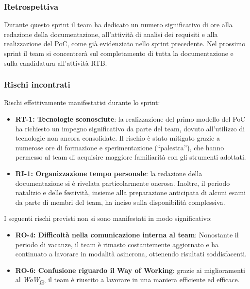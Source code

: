 \documentclass[a4paper,12pt]{article}
\begin{document}
        \subsubsection{Retrospettiva}
        Durante questo sprint il team ha dedicato un numero significativo di ore alla redazione della documentazione, all'attività di analisi dei requisiti e alla realizzazione del PoC, come già evidenziato nello sprint precedente. Nel prossimo sprint il team si concentrerà sul completamento di tutta la documentazione e sulla candidatura all'attività RTB.

        \subsubsection{Rischi incontrati}{
            Rischi effettivamente manifestatisi durante lo sprint:
            \begin{itemize}
                \item \textbf{RT-1: Tecnologie sconosciute}: la realizzazione del primo modello del PoC ha richiesto un impegno significativo da parte del team, dovuto all'utilizzo di tecnologie non ancora consolidate. Il rischio è stato mitigato grazie a numerose ore di formazione e sperimentazione (“palestra”), che hanno permesso al team di acquisire maggiore familiarità con gli strumenti adottati.
                \item \textbf{RI-1: Organizzazione tempo personale}: la redazione della documentazione si è rivelata particolarmente onerosa. Inoltre, il periodo natalizio e delle festività, insieme alla preparazione anticipata di alcuni esami da parte di membri del team, ha inciso sulla disponibilità complessiva.
                \end{itemize}
            
            I seguenti rischi previsti non si sono manifestati in modo significativo:
            \begin{itemize}
                    \item \textbf{RO-4: Difficoltà nella comunicazione interna al team}: Nonostante il periodo di vacanze, il team è rimasto costantemente aggiornato e ha continuato a lavorare in modalità asincrona, ottenendo risultati soddisfacenti.
                    \item \textbf{RO-6: Confusione riguardo il Way of Working}: grazie ai miglioramenti al \textit{WoW}\textsubscript{\href{https://atlasteam9.github.io/Atlas/glossario.html\#WoW}{G}}, il team è riuscito a lavorare in una maniera efficiente ed efficace.
            \end{itemize}
        }
\end{document}
